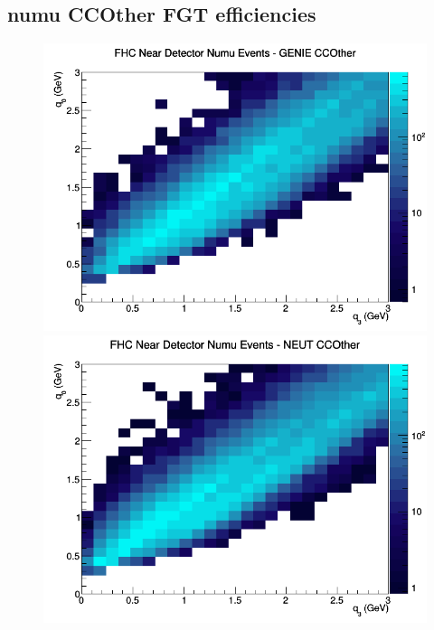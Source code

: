 \subsection{numu CCOther FGT efficiencies}
\begin{figure}[h]
\includegraphics[width=\linewidth]{eff_q0_q3/FGT/CCOther_FHC_ND_numu_q3_q0_GENIE.png}
\endminipage
{}
\includegraphics[width=\linewidth]{eff_q0_q3/FGT/CCOther_FHC_ND_numu_q3_q0_NEUT.png}
\endminipage
{}

\end{figure}

